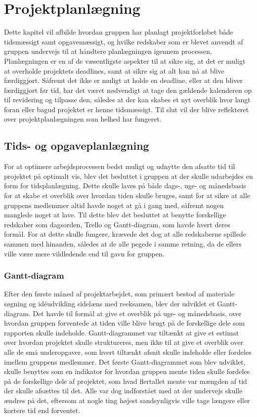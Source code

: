 \chapter{Projektplanlægning}\label{Projektplanlaegning}
Dette kapitel vil afbilde hvordan gruppen har planlagt projektforløbet både tidsmæssigt samt opgavemæssigt, og hvilke redskaber som er blevet anvendt af gruppen undervejs til at håndtere planlægningen igennem processen. Planlægningen er en af de væsentligste aspekter til at sikre sig, at det er muligt at overholde projektets deadlines, samt at sikre sig at alt kan nå at blive færdiggjort. Såfremt det ikke er muligt at holde en deadline, eller at den bliver færdiggjort før tid, har det været nødvendigt at tage den gældende kalenderen op til revidering og tilpasse den, således at der kan skabes et nyt overblik hvor langt foran eller bagud projektet er henne tidsmæssigt. Til slut vil der blive reflekteret over projektplanlægningen som helhed har fungeret.

\section{Tids- og opgaveplanlægning}\label{Tidsplanlaegning}
For at optimere arbejdsprocessen bedst muligt og udnytte den afsatte tid til projektet på optimalt vis, blev det besluttet i gruppen at der skulle udarbejdes en form for tidsplanlægning. Dette skulle laves på både dags-, uge- og månedsbasis for at skabe et overblik over hvordan tiden skulle bruges, samt for at sikre at alle gruppens medlemmer altid havde noget at gå i gang med, såfremt nogen manglede noget at lave. Til dette blev det besluttet at benytte forskellige redskaber som dagsorden, Trello og Gantt-diagram, som havde hvert deres formål. For at dette skulle fungere, krævede det dog at alle redskaberne spillede sammen med hinanden, således at de alle pegede i samme retning, da de ellers ville være mere vildledende end til gavn for gruppen.

\subsection*{Gantt-diagram}\label{Gantt-diagram}
Efter den første måned af projektarbejdet, som primært bestod af materiale søgning og idéudvikling sidelæns med reeksamen, blev der udviklet et Gantt-diagram. Det havde til formål at give et overblik på uge- og månedsbasis, over hvordan gruppen forventede at tiden ville blive brugt på de forskellige dele som rapporten skulle indeholde. Gantt-diagrammet var tiltænkt at give et estimat over hvordan projektet skulle struktureres, men ikke til at give et overblik over alle de små underopgaver, som hvert tiltænkt afsnit skulle indeholde eller fordeles imellem gruppens medlemmer. Det første Gantt-diagrammet som blev udviklet, skulle benyttes som en indikator for hvordan gruppen mente tiden skulle fordeles på de forskellige dele af projektet, som hvad flertallet mente var mængden af tid der skulle afsættes til det. Alle var dog indforstået med at der undervejs skulle ændres på det, eftersom at nogle ting højest sandsynligvis ville tage længere eller kortere tid end forventet.

